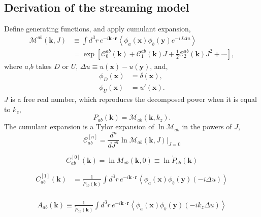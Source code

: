 \documentclass[a4paper,11pt, fleqn]{article}
\begin{document}
\newpage
\subsection{Derivation of the streaming model}


Define generating functions, and apply cumulant expansion,
\begin{align}
  \mathcal{M}^{ab}(\bm{k}, J) &\equiv
  \int \!\! d^3 r \, e^{-i\bm{k}\cdot\bm{r}} \left\langle
  \phi_a(\bm{x}) \phi_b(\bm{y}) e^{-iJ\Delta u} \right\rangle\\
  &= \exp\left[
    \mathcal{C}_0^{ab}(\bm{k}) +
    \mathcal{C}_1^{ab}(\bm{k}) J +
    \frac{1}{2} \mathcal{C}_2^{ab}(\bm{k}) J^2 + \cdots
    \right],
\end{align}
where $a$,$b$ takes $D$ or $U$, $\Delta u \equiv u(\bm{x}) - u(\bm{y})$, and,
\begin{align}
  \phi_D(\bm{x}) &= \delta(\bm{x}),\\
  \phi_U(\bm{x}) &= u'(\bm{x}).
\end{align}
$J$ is a free real number, which reproduces the decomposed power when it is equal to $k_z$,
\begin{equation}
  P_{ab}(\bm{k}) = \mathcal{M}_{ab}(\bm{k}, k_z).
\end{equation}
%
The cumulant expansion is a Tylor expansion of $\ln \mathcal{M}_{ab}$ in the powers of $J$,
%
\begin{equation}
  \mathcal{C}_{ab}^{[n]} = \frac{d^n}{dJ^n}
  \ln \mathcal{M}_{ab}(\bm{k}, J) \Big|_{J=0}
\end{equation}

\begin{equation}
  C_{ab}^{[0]}(\bm{k}) =
  \ln M_{ab}(\bm{k}, 0) \equiv \ln \mathring{P}_{ab}(\bm{k})
\end{equation}

\begin{align}
  C_{ab}^{[1]}(\bm{k}) &= \frac{1}{\mathring{P}_{ab}(\bm{k})}
  \int\!d^3 r \, e^{-i\bm{k}\cdot\bm{r}} \left\langle
  \phi_a(\bm{x}) \phi_b(\bm{y}) (-i \Delta u) \right\rangle\\
\end{align}

\begin{align}
  A_{ab}(\bm{k}) \equiv
  \frac{1}{\mathring{P}_{ab}(\bm{k})}
  \int\!d^3 r \, e^{-i\bm{k}\cdot\bm{r}} \left\langle
  \phi_a(\bm{x}) \phi_b(\bm{y}) (-i k_z \Delta u) \right\rangle\\
\end{align}
\end{document}
